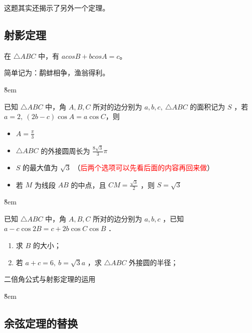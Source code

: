 \begin{tips}
    这题其实还揭示了另外一个定理。
\end{tips}

\subsection{射影定理}
\begin{theorem}[射影定理]
    在 $\triangle ABC$ 中，有 $a cosB + b cosA = c$。

    简单记为：鹬蚌相争，渔翁得利。
\end{theorem}

\v{8em}

\begin{problem}
已知 $\triangle A B C$ 中，角 $A, B, C$ 所对的边分别为 $a, b, c, ~ \triangle A B C$ 的面积记为 $S$ ，若 $a=2, ~(2 b-c) \cos A=a \cos C$，则
\begin{itemize}
    \item $A=\frac{\pi}{3}$
    \item $\triangle A B C$ 的外接圆周长为 $\frac{8 \sqrt{3}}{3} \pi$
    \item $S$ 的最大值为 $\sqrt{3}$ （\textcolor{red}{后两个选项可以先看后面的内容再回来做}）
    \item 若 $M$ 为线段 $A B$ 的中点，且 $C M=\frac{\sqrt{3}}{2}$ ，则 $S=\sqrt{3}$
\end{itemize}
\end{problem}

\v{8em}

\begin{example}
    已知 $\triangle A B C$ 中，角 $A, B, C$ 所对的边分别为 $a, b, c$ ，已知 $a-c \cos 2 B=c+2 b \cos C \cos B$ ．
    \begin{enumerate}
        \item 求 $B$ 的大小；

        \item 若 $a+c=6, ~ b=\sqrt{3} a$ ，求 $\triangle A B C$ 外接圆的半径；
    \end{enumerate}
\end{example}

\begin{tips}
    二倍角公式与射影定理的运用
\end{tips}

\v{8em}

\subsection{余弦定理的替换}


